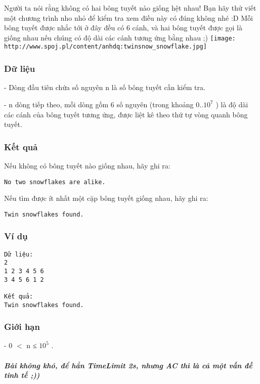 



   Người ta nói rằng không có hai bông tuyết nào giống hệt nhau! Bạn hãy thử viết một chương trình nho nhỏ để kiểm tra xem điều này có đúng không nhé :D Mỗi bông tuyết được nhắc tới ở đây đều có 6 cánh, và hai bông tuyết được gọi là giống nhau nếu chúng có độ dài các cánh tương ứng bằng nhau ;)  
\texttt{[image: http://www.spoj.pl/content/anhdq:twinsnow\_snowflake.jpg]}

\subsubsection{   Dữ liệu  }

   - Dòng đầu tiên chứa số nguyên n là số bông tuyết cần kiểm tra.   


   - n dòng tiếp theo, mỗi dòng gồm 6 số nguyên (trong khoảng 0..$10^{7}$   ) là độ dài các cánh của bông tuyết tương ứng, được liệt kê theo thứ tự vòng quanh bông tuyết.  

\subsubsection{   Kết quả  }

   Nếu không có bông tuyết nào giống nhau, hãy ghi ra:  
\begin{verbatim}
No two snowflakes are alike.\end{verbatim}

   Nếu tìm được ít nhất một cặp bông tuyết giống nhau, hãy ghi ra:  
\begin{verbatim}
Twin snowflakes found.\end{verbatim}

\subsubsection{   Ví dụ  }
\begin{verbatim}
Dữ liệu:
2
1 2 3 4 5 6
3 4 5 6 1 2

Kết quả:
Twin snowflakes found.
\end{verbatim}

\subsubsection{   Giới hạn  }

   - 0 $<$ n ≤ $10^{5}$   .  

\paragraph{\textit{    Bài không khó, để hẳn TimeLimit 2s, nhưng AC thì là cả một vấn đề tinh tế ;))   }}
